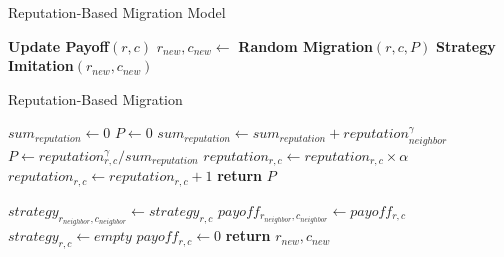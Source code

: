 \documentclass[11pt]{article}
\begin{document}
\begin{algorithm}[!htbp]
  \caption{Reputation-Based Migration Model}\label{reputationbased}
	\begin{algorithmic}[1]
			
			\State \textbf{Update Payoff$(r,c)$}
			\State $r_{new},c_{new} \gets$ \textbf{Random Migration$(r,c,P)$}
			\State \textbf{Strategy Imitation$(r_{new},c_{new})$}
		\EndFor      
		\EndFor      
    \EndProcedure
	\end{algorithmic}
\end{algorithm}

\begin{algorithm}[!htbp]
  \caption{Reputation-Based Migration}\label{reputationbasedmigration}
	\begin{algorithmic}[1]
      \State $sum_{reputation} \gets 0$
	  \State $P \gets 0$
        \State $sum_{reputation} \gets sum_{reputation} + reputation_{neighbor}^{\gamma}$
      \EndFor
      	\State $P \gets reputation_{r,c}^{\gamma} / sum_{reputation}$
      \EndIf
      \State $reputation_{r,c} \gets reputation_{r,c} \times \alpha$ 
      	\State $reputation_{r,c} \gets reputation_{r,c} + 1$
      \EndIf
      \State \textbf{return} $P$ 
    \EndProcedure
  \end{algorithmic}
		
	\begin{algorithmic}[1]
       
      \State $strategy_{r_{neighbor},c_{neighbor}} \gets strategy_{r,c}$   
      \State $payoff_{r_{neighbor},c_{neighbor}} \gets payoff_{r,c}$
      \State $strategy_{r,c} \gets empty$   
      \State $payoff_{r,c} \gets 0$
      \State \textbf{return} $r_{new},c_{new}$	
    \EndProcedure
  \end{algorithmic}
\end{algorithm}
\end{document}
